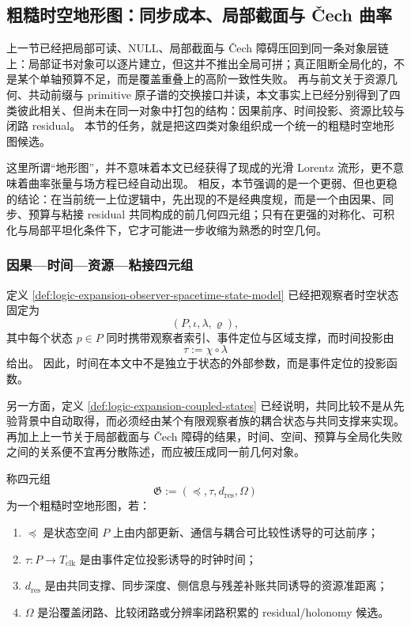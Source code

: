 \subsection{粗糙时空地形图：同步成本、局部截面与 Čech 曲率}\label{subsec:typed-address-biaxial-completion-rough-spacetime-topography}
上一节已经把局部可读、\(\mathrm{NULL}\)、局部截面与 Čech 障碍压回到同一条对象层链上：局部证书对象可以逐片建立，但这并不推出全局可拼；真正阻断全局化的，不是某个单轴预算不足，而是覆盖重叠上的高阶一致性失败。
再与前文关于资源几何、共动前缀与 primitive 原子谱的交换接口并读，本文事实上已经分别得到了四类彼此相关、但尚未在同一对象中打包的结构：因果前序、时间投影、资源比较与闭路 residual。
本节的任务，就是把这四类对象组织成一个统一的粗糙时空地形图候选。

这里所谓“地形图”，并不意味着本文已经获得了现成的光滑 Lorentz 流形，更不意味着曲率张量与场方程已经自动出现。
相反，本节强调的是一个更弱、但也更稳的结论：在当前统一上位逻辑中，先出现的不是经典度规，而是一个由因果、同步、预算与粘接 residual 共同构成的前几何四元组；只有在更强的对称化、可积化与局部平坦化条件下，它才可能进一步收缩为熟悉的时空几何。

\subsubsection{因果—时间—资源—粘接四元组}\label{subsubsec:typed-address-biaxial-completion-rough-spacetime-quadruple}
定义 \ref{def:logic-expansion-observer-spacetime-state-model} 已经把观察者时空状态固定为
\[
(P,\iota,\lambda,\varrho),
\]
其中每个状态 \(p\in P\) 同时携带观察者索引、事件定位与区域支撑，而时间投影由
\[
\tau:=\chi\circ\lambda
\]
给出。
因此，时间在本文中不是独立于状态的外部参数，而是事件定位的投影函数。

另一方面，定义 \ref{def:logic-expansion-coupled-states} 已经说明，共同比较不是从先验背景中自动取得，而必须经由某个有限观察者族的耦合状态与共同支撑来实现。
再加上上一节关于局部截面与 Čech 障碍的结果，时间、空间、预算与全局化失败之间的关系便不宜再分散陈述，而应被压成同一前几何对象。

\begin{definition}[粗糙时空地形图]\label{def:typed-address-biaxial-completion-rough-spacetime-topography}
称四元组
\[
\mathfrak G:=(\preceq,\tau,d_{\mathrm{res}},\Omega)
\]
为一个粗糙时空地形图，若：
\begin{enumerate}
  \item \(\preceq\) 是状态空间 \(P\) 上由内部更新、通信与耦合可比较性诱导的可达前序；
  \item \(\tau:P\to T_{\mathrm{clk}}\) 是由事件定位投影诱导的时钟时间；
  \item \(d_{\mathrm{res}}\) 是由共同支撑、同步深度、侧信息与残差补账共同诱导的资源准距离；
  \item \(\Omega\) 是沿覆盖闭路、比较闭路或分辨率闭路积累的 residual/holonomy 候选。
\end{enumerate}
\end{definition}

